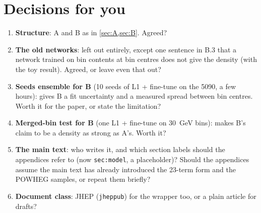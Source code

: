 \documentclass[11pt]{article}
\newcommand{\code}[1]{\texttt{#1}}
\begin{document}
\section{Decisions for you}
\label{sec:decisions}

\begin{keyidea}
\begin{enumerate}
  \item \textbf{Structure}: A and B as in \cref{sec:A,sec:B}. Agreed?
  \item \textbf{The old networks}: left out entirely, except one sentence in B.3 that a network trained on bin
    contents at bin centres does not give the density (with the toy result). Agreed, or leave even that out?
  \item \textbf{Seeds ensemble for B} (10 seeds of L1 + fine-tune on the 5090, a few hours): gives B a fit
    uncertainty and a measured spread between bin centres. Worth it for the paper, or state the limitation?
  \item \textbf{Merged-bin test for B} (one L1 + fine-tune on 30~GeV bins): makes B's claim to be a density as
    strong as A's. Worth it?
  \item \textbf{The main text}: who writes it, and which section labels should the appendices refer to (now
    \code{sec:model}, a placeholder)? Should the appendices assume the main text has already introduced the
    23-term form and the POWHEG samples, or repeat them briefly?
  \item \textbf{Document class}: JHEP (\code{jheppub}) for the wrapper too, or a plain article for drafts?
\end{enumerate}
\end{keyidea}
\end{document}

